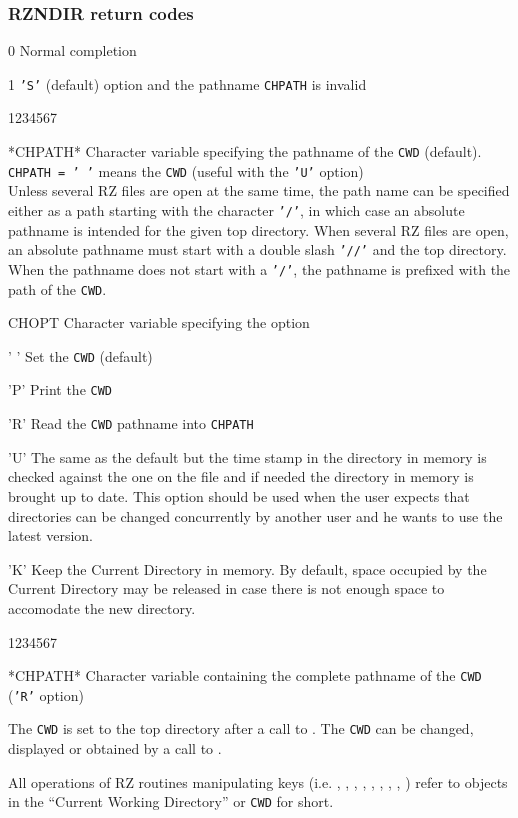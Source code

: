 \subsubsection*{RZNDIR return codes}
\begin{DLtt}{12}
\item[0]Normal completion
\item[1]{\tt'S'} (default) option and the pathname {\tt CHPATH} is invalid
\end{DLtt}
\Idesc
\begin{DLtt}{1234567}
\item[*CHPATH*]Character variable specifying the pathname of the {\tt CWD}
(default).\\
{\tt CHPATH = ' '} means the {\tt CWD} (useful with the {\tt'U'} option)\\
Unless several RZ files are open at the same time, the path name can
be specified either as a path starting with the character {\tt'/'}, in
which case an absolute pathname is intended for the given top directory.
When several RZ files are open, an absolute pathname must start with a
double slash {\tt'//'} and the top directory.
When the pathname does not start with a {\tt'/'}, the pathname is prefixed
with the path of the {\tt CWD}.
\item[CHOPT]Character variable specifying the option
\begin{DLtt}{12}
\item[' ']Set the {\tt CWD} (default)
\item['P']Print the {\tt CWD}
\item['R']Read the {\tt CWD} pathname into {\tt CHPATH}
\item['U']The same as the default but the time stamp in the
directory in memory is checked against the one on the file and if
needed the directory in memory is brought up to date.
This option should be used when the user expects that directories can be
changed concurrently by another user and he wants to use the latest
version.
\item['K']Keep the Current Directory in memory. By default, space occupied
by the Current Directory may be released in case there is not enough
space to accomodate the new directory.
\end{DLtt}
\end{DLtt}
\Odesc
\begin{DLtt}{1234567}
\item[*CHPATH*]Character variable containing the complete pathname of the
{\tt CWD} ({\tt'R'} option)
\end{DLtt}
\par 
The {\tt CWD} is set to the top directory after a call to .
The {\tt CWD} can be changed, displayed or obtained by a call to .
\par 
All operations of RZ routines manipulating keys
(i.e. , , , ,
, , , ,
) refer to objects in
the ``Current Working Directory'' or {\tt CWD} for short.

